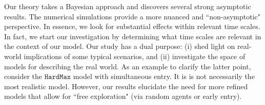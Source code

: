 \documentclass[10pt]{article}
\newcommand{\term}[1]{\ensuremath{\mathtt{#1}}\xspace}
\newcommand{\HardMax}{\term{HardMax}}
\begin{document}
Our theory takes a Bayesian approach and discovers several strong asymptotic results. The numerical simulations provide a more nuanced and ``non-asymptotic" perspective. In essence, we look for substantial effects within relevant time scales. In fact, we start our investigation by determining what time scales are relevant in the context of our model. Our study has a dual purpose: (i) shed light on real-world implications of some typical scenarios, and (ii) investigate the space of models for describing the real world. As an example to clarify the latter point, consider the \HardMax model with simultaneous entry. It is is not necessarily the most realistic model. However, our results elucidate the need for more refined models that allow for ``free exploration" (\eg via random agents or early entry).



\newpage

%
%





\clearpage
%
\end{document}
